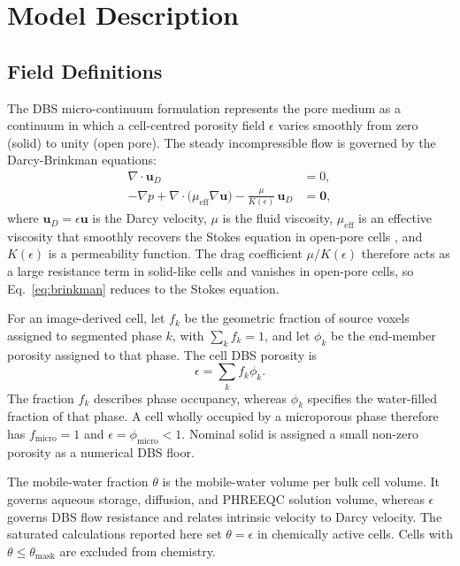 \section{Model Description}
\label{sec:model}

\subsection{Field Definitions}

The DBS micro-continuum formulation \citep{brinkman1949calculation,soulaine2016micro,
soulaine2024microcontinuum} represents the pore medium as a continuum in which
a cell-centred porosity field $\epsilon$ varies smoothly from
zero (solid) to unity (open pore). The steady incompressible flow is governed
by the Darcy-Brinkman equations:
\begin{align}
\nabla \cdot \bm{u}_D &= 0,
\label{eq:continuity} \\
-\nabla p + \nabla \cdot \bigl(\mu_{\mathrm{eff}} \nabla \bm{u}\bigr)
- \frac{\mu}{K(\epsilon)}\,\bm{u}_D &= \bm{0},
\label{eq:brinkman}
\end{align}
where $\bm{u}_D = \epsilon\bm{u}$ is the Darcy velocity,
$\mu$ is the fluid viscosity, $\mu_{\mathrm{eff}}$ is an effective
viscosity that smoothly recovers the Stokes equation in open-pore cells
\citep{soulaine2016micro}, and $K(\epsilon)$ is a permeability
function. The drag coefficient $\mu/K(\epsilon)$ therefore acts
as a large resistance term in solid-like cells and vanishes in open-pore cells,
so Eq.~\eqref{eq:brinkman} reduces to the Stokes equation.

For an image-derived cell, let $f_k$ be the geometric fraction of source voxels
assigned to segmented phase $k$, with $\sum_k f_k=1$, and let $\phi_k$ be the
end-member porosity assigned to that phase. The cell DBS porosity is
\begin{equation}
\epsilon=\sum_k f_k\phi_k.
\label{eq:phase_porosity}
\end{equation}
The fraction $f_k$ describes phase occupancy, whereas $\phi_k$ specifies the
water-filled fraction of that phase. A cell wholly occupied by a microporous
phase therefore has $f_{\mathrm{micro}}=1$ and
$\epsilon=\phi_{\mathrm{micro}}<1$. Nominal solid is assigned a small non-zero
porosity as a numerical DBS floor.

The mobile-water fraction $\theta$ is the mobile-water volume per bulk cell
volume. It governs aqueous storage, diffusion, and PHREEQC solution volume,
whereas $\epsilon$ governs DBS flow resistance and relates intrinsic velocity
to Darcy velocity. The saturated calculations reported here set
$\theta=\epsilon$ in chemically active cells. Cells with
$\theta\leq\theta_{\mathrm{mask}}$ are excluded from chemistry.

